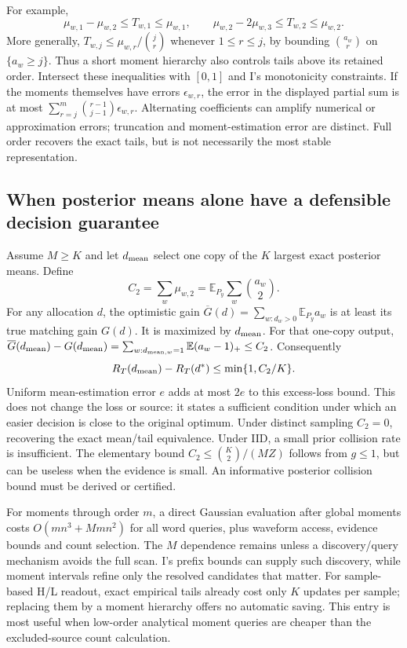 \documentclass[10pt,a4paper]{article}
\newcommand{\E}{\mathbb E}
\begin{document}
For example,
\[
 \mu_{w,1}-\mu_{w,2}\leq T_{w,1}\leq\mu_{w,1},\qquad
 \mu_{w,2}-2\mu_{w,3}\leq T_{w,2}\leq\mu_{w,2}.
\]
More generally, $T_{w,j}\leq\mu_{w,r}/\binom jr$ whenever $1\leq r\leq j$, by bounding
$\binom{a_w}{r}$ on $\{a_w\geq j\}$. Thus a short moment hierarchy also controls tails above its retained
order. Intersect these inequalities with $[0,1]$ and I's monotonicity constraints.
If the moments themselves have errors $\epsilon_{w,r}$, the error in the displayed partial sum is at most
$\sum_{r=j}^m\binom{r-1}{j-1}\epsilon_{w,r}$. Alternating coefficients can amplify numerical or approximation
errors; truncation and moment-estimation error are distinct. Full order recovers the exact tails, but is
not necessarily the most stable representation.

\newpage
\subsection{When posterior means alone have a defensible decision guarantee}
Assume $M\geq K$ and let $d_{\rm mean}$ select one copy of the $K$ largest exact posterior means.
Define
\[
 C_2=\sum_w\mu_{w,2}=\E_{P_y}\sum_w\binom{a_w}{2}.
\]
For any allocation $d$, the optimistic gain
$\overline G(d)=\sum_{w:d_w>0}\E_{P_y}a_w$ is at least its true matching gain $G(d)$.
It is maximized by $d_{\rm mean}$. For that one-copy output,
$\overline G(d_{\rm mean})-G(d_{\rm mean})
 =\sum_{w:d_{{\rm mean},w}=1}\E(a_w-1)_+\leq C_2$.
Consequently
\begin{equation}
 R_T(d_{\rm mean})-R_T(d^*)\leq\min\{1,C_2/K\}.
 \label{eq:mean-collision-regret}
\end{equation}
Uniform mean-estimation error $e$ adds at most $2e$ to this excess-loss bound.
This does not change the loss or source: it states a sufficient condition under which an easier decision
is close to the original optimum. Under distinct sampling $C_2=0$, recovering the exact mean/tail equivalence.
Under IID, a small prior collision rate is insufficient. The elementary bound
$C_2\leq\binom K2/(MZ)$ follows from $g\leq1$, but can be useless when the evidence is small.
An informative posterior collision bound must be derived or certified.

For moments through order $m$, a direct Gaussian evaluation after global moments costs
$O(mn^3+Mmn^2)$ for all word queries, plus waveform access, evidence bounds and count selection.
The $M$ dependence remains unless a discovery/query mechanism avoids the full scan. I's prefix bounds
can supply such discovery, while moment intervals refine only the resolved candidates that matter.
For sample-based H/L readout, exact empirical tails already cost only $K$ updates per sample; replacing
them by a moment hierarchy offers no automatic saving. This entry is most useful when low-order
analytical moment queries are cheaper than the excluded-source count calculation.
\end{document}
